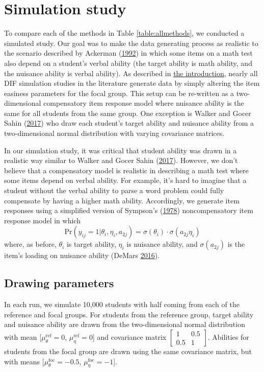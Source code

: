 \documentclass[
  11pt,
]{article}
\begin{document}
\hypertarget{simulation-study}{%
\section{Simulation study}\label{simulation-study}}

To compare each of the methods in Table \ref{table:allmethods}, we conducted a simulated study. Our goal was to make the data generating process as realistic to the scenario described by Ackerman (\protect\hyperlink{ref-ackerman1992didactic}{1992}) in which some items on a math test also depend on a student's verbal ability (the target ability is math ability, and the nuisance ability is verbal ability). As described in \protect\hyperlink{intro}{the introduction}, nearly all DIF simulation studies in the literature generate data by simply altering the item easiness parameters for the focal group. This setup can be re-written as a two-dimensional compensatory item response model where nuisance ability is the same for all students from the same group. One exception is Walker and Gocer Sahin (\protect\hyperlink{ref-walker2017using}{2017}) who draw each student's target ability and nuisance ability from a two-dimensional normal distribution with varying covariance matrices.

In our simulation study, it was critical that student ability was drawn in a realistic way similar to Walker and Gocer Sahin (\protect\hyperlink{ref-walker2017using}{2017}). However, we don't believe that a compensatory model is realistic in describing a math test where some items depend on verbal ability. For example, it's hard to imagine that a student without the verbal ability to parse a word problem could fully compensate by having a higher math ability. Accordingly, we generate item responses using a simplified version of Sympson's (\protect\hyperlink{ref-sympson1978model}{1978}) noncompensatory item response model in which
\[
\text{Pr}(y_{ij} = 1 | \theta_i, \eta_i, a_{2j}) = \sigma(\theta_i) \cdot \sigma(a_{2j}\eta_i)
\]
where, as before, \(\theta_i\) is target ability, \(\eta_i\) is nuisance ability, and \(\sigma(a_{2j})\) is the item's loading on nuisance ability (DeMars \protect\hyperlink{ref-demars2016partially}{2016}).

\hypertarget{drawing-parameters}{%
\subsection{Drawing parameters}\label{drawing-parameters}}

In each run, we simulate 10,000 students with half coming from each of the reference and focal groups. For students from the reference group, target ability and nuisance ability are drawn from the two-dimensional normal distribution with mean {[}\(\mu_\theta^\text{ref} = 0\), \(\mu_\eta^\text{ref} = 0\){]} and covariance matrix \(\begin{bmatrix} 1 & 0.5 \\ 0.5 & 1 \end{bmatrix}\). Abilities for students from the focal group are drawn using the same covariance matrix, but with means {[}\(\mu_\theta^\text{foc} = -0.5\), \(\mu_\eta^\text{foc} = -1\){]}.
\end{document}
